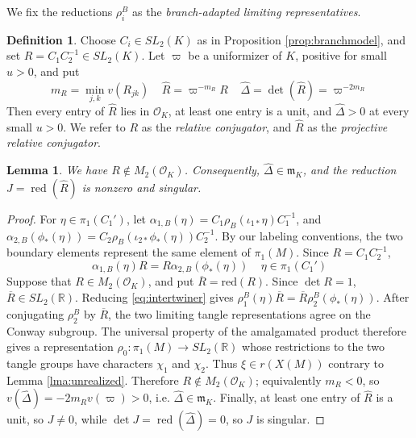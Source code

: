 \documentclass{article}
\theoremstyle{plain}
\theoremstyle{definition}
\newtheorem{definition}[theorem]{Definition}
\theoremstyle{plain}
\theoremstyle{plain}
\theoremstyle{plain}
\newtheorem{lemma}[theorem]{Lemma}
\theoremstyle{remark}
\theoremstyle{remark}
\theoremstyle{plain}
\theoremstyle{plain}
\theoremstyle{plain}
\theoremstyle{plain}
\begin{document}
We fix the reductions $\rho_i^B$ as the \emph{branch-adapted limiting representatives}. 

\begin{definition}\label{def:conjugator}
Choose $C_i \in SL_2(K)$ as in Proposition \ref{prop:branchmodel}, and set $R = C_1C_2^{-1} \in SL_2(K)$. Let $\varpi$ be a uniformizer of $K$, positive for small $u > 0$, and put
\begin{equation*}
	m_R = \min_{j,k}v(R_{jk}) \ \ \ \ \ \widehat R = \varpi^{-m_R}R \ \ \ \ \ \widehat\Delta = \det(\widehat R) = \varpi^{-2m_R}	
\end{equation*}
Then every entry of $\widehat{R}$ lies in $\mathcal{O}_K$, at least one entry is a unit, and $\widehat\Delta > 0$ at every small $u > 0$. We refer to $R$ as the \emph{relative conjugator}, and $\widehat R$ as the \emph{projective relative conjugator}. 
\end{definition}

\begin{lemma}\label{lma:unbounded}
We have $R \notin M_2(\mathcal O_K)$. Consequently, $\widehat\Delta \in \mathfrak m_K$, and the reduction $J=\operatorname{red}(\widehat R)$ is nonzero and singular.
\end{lemma}

\begin{proof}
For $\eta\in\pi_1(C_1')$, let $\alpha_{1,B}(\eta) = C_1\rho_B(\iota_{1*}\eta)C_1^{-1}$, and $\alpha_{2,B}(\phi_*(\eta)) = C_2\rho_B(\iota_{2*}\phi_*(\eta))C_2^{-1}$. By our labeling conventions, the two boundary elements represent the same element of $\pi_1(M)$. Since $R = C_1C_2^{-1}$, 
\begin{equation}\label{eq:intertwiner}
	\alpha_{1,B}(\eta)R = R\alpha_{2,B}(\phi_*(\eta)) \ \ \ \ \ \eta \in \pi_1(C_1')
\end{equation}
Suppose that $R \in M_2(\mathcal O_K)$, and put $\overline R = \mathrm{red}(R)$. Since $\det R = 1$, $\overline R \in SL_2(\mathbb{R})$. Reducing \eqref{eq:intertwiner} gives $\rho_1^B(\eta)\overline R = \overline R\rho_2^B(\phi_*(\eta))$. After conjugating $\rho_2^B$ by $\overline R$, the two limiting tangle representations agree on the Conway subgroup. The universal property of the amalgamated product therefore gives a representation $\rho_0:\pi_1(M)\longrightarrow SL_2(\mathbb R)$ whose restrictions to the two tangle groups have characters $\chi_1$ and $\chi_2$. Thus $\xi\in r(X(M))$ contrary to Lemma \ref{lma:unrealized}. Therefore $R \notin M_2(\mathcal O_K)$; equivalently $m_R < 0$, so $v(\widehat\Delta) = -2m_Rv(\varpi) > 0$, i.e. $\widehat\Delta \in \mathfrak m_K$. Finally, at least one entry of $\widehat R$ is a unit, so $J\neq0$, while $\det J = \operatorname{red}(\widehat\Delta) = 0$, so $J$ is singular.
\end{proof}
\end{document}
